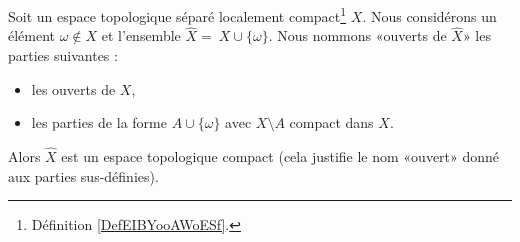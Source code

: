 \begin{propositionDef}       \label{PROPooHNOZooPSzKIN}
	Soit un espace topologique séparé localement compact\footnote{Définition \ref{DefEIBYooAWoESf}.} \( X\). Nous considérons un élément \( \omega\notin X\) et l'ensemble \( \hat X =\ X\cup\{ \omega \}\). Nous nommons «ouverts de \( \hat X\)» les parties suivantes :
	\begin{itemize}
		\item les ouverts de \( X\),
		\item les parties de la forme \( A\cup\{ \omega \}\) avec \( X\setminus A\) compact dans \( X\).
	\end{itemize}
	Alors \( \hat X\) est un espace topologique compact (cela justifie le nom «ouvert» donné aux parties sus-définies).
\end{propositionDef}

